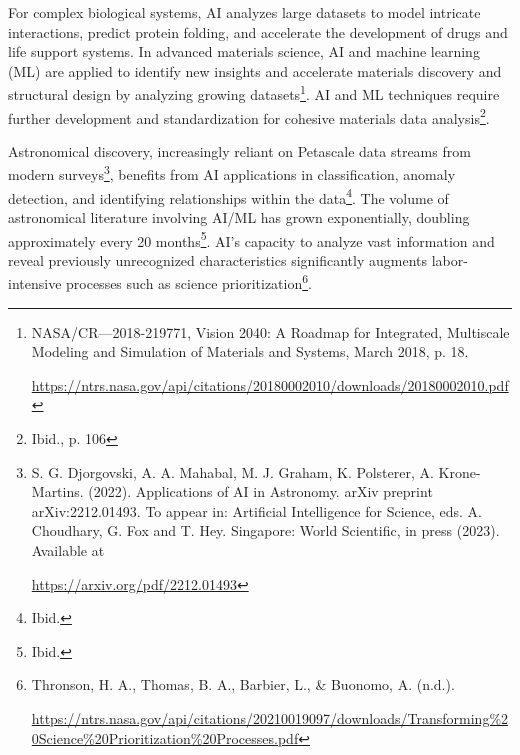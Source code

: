 \documentclass[fontsize=10pt, oneside, DIV=calc]{scrartcl}
\begin{document}
\noindent
For complex biological systems, AI analyzes large datasets to model intricate interactions, predict protein folding, and accelerate the development of drugs and life support systems. In advanced materials science, AI and machine learning (ML) are applied to identify new insights and accelerate materials discovery and structural design by analyzing growing datasets\footnote{NASA/CR—2018-219771, Vision 2040: A Roadmap for Integrated, Multiscale Modeling and Simulation of Materials and Systems, March 2018, p. 18. 







\href{https://ntrs.nasa.gov/api/citations/20180002010/downloads/20180002010.pdf}\url{https://ntrs.nasa.gov/api/citations/20180002010/downloads/20180002010.pdf}}. AI and ML techniques require further development and standardization for cohesive materials data analysis\footnote{Ibid., p. 106}.

\medskip

\noindent
Astronomical discovery, increasingly reliant on Petascale data streams from modern surveys\footnote{S. G. Djorgovski, A. A. Mahabal, M. J. Graham, K. Polsterer, A. Krone-Martins. (2022). Applications of AI in Astronomy. arXiv preprint arXiv:2212.01493. To appear in: Artificial Intelligence for Science, eds. A. Choudhary, G. Fox and T. Hey. Singapore: World Scientific, in press (2023). Available at 







\href{https://arxiv.org/pdf/2212.01493}\url{https://arxiv.org/pdf/2212.01493}}, benefits from AI applications in classification, anomaly detection, and identifying relationships within the data\footnote{Ibid.}. The volume of astronomical literature involving AI/ML has grown exponentially, doubling approximately every 20 months\footnote{Ibid.}. AI's capacity to analyze vast information and reveal previously unrecognized characteristics significantly augments labor-intensive processes such as science prioritization\footnote{Thronson, H. A., Thomas, B. A., Barbier, L., \& Buonomo, A. (n.d.). 







\href{https://ntrs.nasa.gov/api/citations/20210019097/downloads/Transforming\%20Science\%20Prioritization\%20Processes.pdf}\url{https://ntrs.nasa.gov/api/citations/20210019097/downloads/Transforming\%20Science\%20Prioritization\%20Processes.pdf}}.
\end{document}
